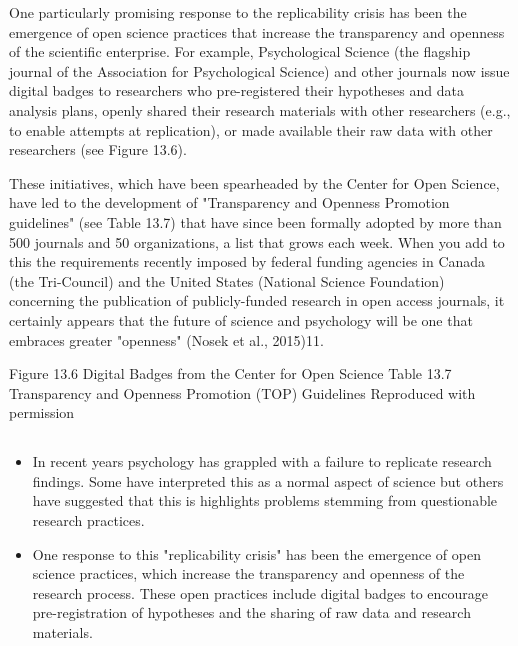 One particularly promising response to the replicability crisis has been the emergence of open science practices that increase the transparency and openness of the scientific enterprise. For example, Psychological Science (the flagship journal of the Association for Psychological Science) and other journals now issue digital badges to researchers who pre-registered their hypotheses and data analysis plans, openly shared their research materials with other researchers (e.g., to enable attempts at replication), or made available their raw data with other researchers (see Figure 13.6).


These initiatives, which have been spearheaded by the Center for Open Science, have led to the development of "Transparency and Openness Promotion guidelines" (see Table 13.7) that have since been formally adopted by more than 500 journals and 50 organizations, a list that grows each week. When you add to this the requirements recently imposed by federal funding agencies in Canada (the Tri-Council) and the United States (National Science Foundation) concerning the publication of publicly-funded research in open access journals, it certainly appears that the future of science and psychology will be one that embraces greater "openness" (Nosek et al., 2015)11.


Figure 13.6 Digital Badges from the Center for Open Science
 Table 13.7 Transparency and Openness Promotion (TOP) Guidelines Reproduced with permission


\subsection{}
\begin{fullwidth}
\begin{itemize}
\item In recent years psychology has grappled with a failure to replicate research findings. Some have interpreted this as a normal aspect of science but others have suggested that this is highlights
problems stemming from questionable research practices.

\item One response to this "replicability crisis" has been the emergence of open science practices,
which increase the transparency and openness of the research process. These open practices include digital badges to encourage pre-registration of hypotheses and the sharing of raw data and research materials.


\end{itemize}
\end{fullwidth}


